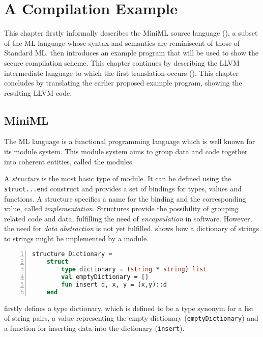 \chapter{A Compilation Example\label{chap:ACompilationExample}}

This chapter firstly informally describes the \mbox{MiniML} source language (), a subset of the ML language whose syntax and semantics are reminiscent of those of Standard ML.
 then introduces an example program that will be used to show the secure compilation scheme.
This chapter continues by describing the LLVM intermediate language to which the first translation occurs ().
This chapter concludes by translating the earlier proposed example program, showing the resulting LLVM code.

\section{MiniML\label{sec:MiniML}}
The ML language is a functional programming language which is well known for its module system.
This module system aims to group data and code together into coherent entities, called the modules.

A \emph{structure} is the most basic type of module.
It can be defined using the \texttt{struct...end} construct and provides a set of bindings for types, values and functions.
A structure specifies a name for the binding and the corresponding value, called \emph{implementation}.
Structures provide the possibility of grouping related code and data, fulfilling the need of \emph{encapsulation} in software.
However, the need for \emph{data abstraction} is not yet fulfilled.
 shows how a dictionary of strings to strings might be implemented by a module.
~
\begin{lstlisting}[frame=single, language=ML,caption=An example structure showing the definition of a dictionary in ML, label=code:DictionaryStructureExample,numbers=left]
structure Dictionary =
    struct
        type dictionary = (string * string) list
        val emptyDictionary = []
        fun insert d, x, y = (x,y)::d
    end
\end{lstlisting}

 firstly defines a type dictionary, which is defined to be a type synonym for a list of string pairs, a value representing the empty dictionary (\texttt{emptyDictionary}) and a function for inserting data into the dictionary (\texttt{insert}).

